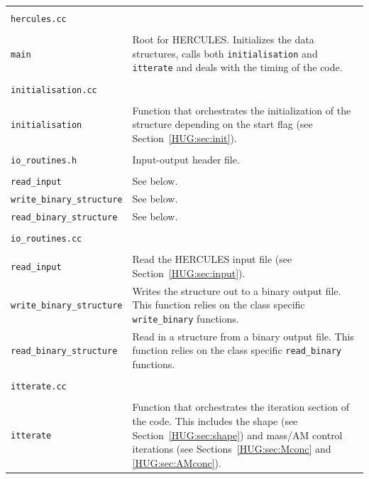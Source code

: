 \documentclass[11pt, oneside]{article}   	%
\begin{document}
\begin{longtable}{l p{10cm}}
\multicolumn{2}{l}{} \\
\multicolumn{2}{l}{\texttt{hercules.cc}} \\
\hline \\
\texttt{main} & Root for HERCULES. Initializes the data structures, calls both \texttt{initialisation} and \texttt{itterate} and deals with the timing of the code. \\

\multicolumn{2}{l}{} \\
\multicolumn{2}{l}{\texttt{initialisation.cc}} \\
\hline \\
\texttt{initialisation} & Function that orchestrates the initialization of the structure depending on the start flag (see Section~\ref{HUG:sec:init}). \\

\multicolumn{2}{l}{} \\
\texttt{io\_routines.h} & Input-output header file. \\
\hline \\
\texttt{read\_input} & See below. \\
\texttt{write\_binary\_structure} & See below. \\
\texttt{read\_binary\_structure} & See below. \\

\multicolumn{2}{l}{} \\
\multicolumn{2}{l}{\texttt{io\_routines.cc}} \\
\hline \\
\texttt{read\_input} & Read the HERCULES input file (see Section~\ref{HUG:sec:input}). \\
\texttt{write\_binary\_structure} & Writes the structure out to a binary output file. This function relies on the class specific \texttt{write\_binary} functions. \\
\texttt{read\_binary\_structure} & Read in a structure from a binary output file. This function relies on the class specific \texttt{read\_binary} functions. \\

\multicolumn{2}{l}{} \\
\multicolumn{2}{l}{\texttt{itterate.cc}} \\
\hline \\
\texttt{itterate} & Function that orchestrates the iteration section of the code. This includes the shape (see Section~\ref{HUG:sec:shape}) and mass/AM control iterations (see Sections~\ref{HUG:sec:Mconc} and \ref{HUG:sec:AMconc}). \\


\end{longtable}
\end{document}
